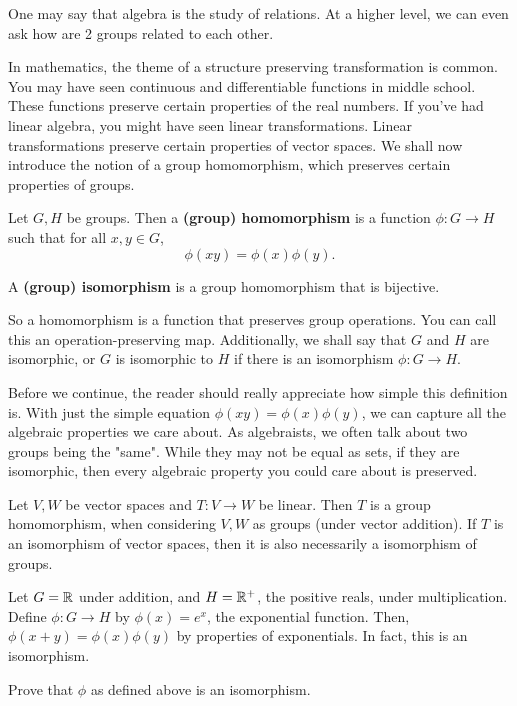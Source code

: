 \documentclass[./main.tex]{subfiles}
\begin{document}
One may say that algebra is the study of relations. At a higher level, we can
even ask how are 2 groups related to each other. 

In mathematics, the theme of a structure preserving transformation is common.
You may have seen continuous and differentiable functions in middle school.
These functions preserve certain properties of the real numbers. If you've had
linear algebra, you might have seen linear transformations. Linear
transformations preserve certain properties of vector spaces. We shall now
introduce the notion of a group homomorphism, which preserves certain properties
of groups.
\begin{definition}
\label{def:group-homomorphism}
Let $G, H$ be groups. Then a \textbf{(group) homomorphism} is a function $\phi:
G \to H$ such that for all $x, y \in G$,
\[
    \phi(xy) = \phi(x)\phi(y).
\]  

A \textbf{(group) isomorphism} is a group homomorphism that is bijective. 
\end{definition}
So a homomorphism is a function that preserves group operations. You can call
this an operation-preserving map. Additionally, we shall say that $G$ and $H$
are isomorphic, or $G$ is isomorphic to $H$ if there is an isomorphism $\phi: G
\to H$.

Before we continue, the reader should really appreciate how simple this
definition is. With just the simple equation $\phi(xy) = \phi(x)\phi(y)$, we can
capture all the algebraic properties we care about. As algebraists, we often
talk about two groups being the "same". While they may not be equal as sets, if
they are isomorphic, then every algebraic property you could care about is
preserved.

\begin{example}
    Let $V, W$ be vector spaces and $T: V \to W$ be linear. Then $T$ is a group
    homomorphism, when considering $V, W$ as groups (under vector addition). If
    $T$ is an isomorphism of vector spaces, then it is also necessarily a
    isomorphism of groups.
\end{example}

\begin{example}[Exponential]
    Let $G = \mathbb{R}$ under addition, and $H = \mathbb{R}^+$, the positive reals, under
    multiplication. Define $\phi: G \to H$ by $\phi(x) = e^x$, the exponential
    function. Then, $\phi(x+y) = \phi(x) \phi(y)$ by properties of exponentials.
    In fact, this is an isomorphism.
\end{example}
\begin{exercise}
    Prove that $\phi$ as defined above is an isomorphism.
\end{exercise}
\end{document}
